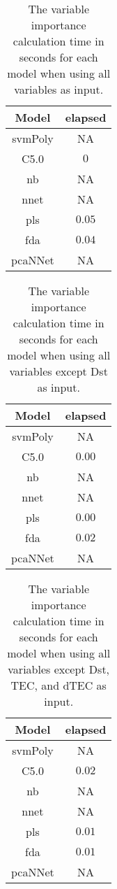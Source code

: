 \begin{table}[!ht]
	\centering
	\begin{tabular}{|c|c|}
		\hline
		Model & elapsed \\ \hline
		svmPoly & NA \\ \hline
		C5.0 & $0$ \\ \hline
		nb & NA \\ \hline
		nnet & NA \\ \hline
		pls & $0.05$ \\ \hline
		fda & $0.04$ \\ \hline
		pcaNNet & NA \\ \hline
	\end{tabular}
	\caption{The variable importance calculation time in seconds for each model when using all variables as input.}
	\label{tab:time:all:importance}
\end{table}

\begin{table}[!ht]
	\centering
	\begin{tabular}{|c|c|}
		\hline
		Model & elapsed \\ \hline
		svmPoly & NA \\ \hline
		C5.0 & $0.00$ \\ \hline
		nb & NA \\ \hline
		nnet & NA \\ \hline
		pls & $0.00$ \\ \hline
		fda & $0.02$ \\ \hline
		pcaNNet & NA \\ \hline
	\end{tabular}
	\caption{The variable importance calculation time in seconds for each model when using all variables except Dst as input.}
	\label{tab:time:noDst:importance}
\end{table}

\begin{table}[!ht]
	\centering
	\begin{tabular}{|c|c|}
		\hline
		Model & elapsed \\ \hline
		svmPoly & NA \\ \hline
		C5.0 & $0.02$ \\ \hline
		nb & NA \\ \hline
		nnet & NA \\ \hline
		pls & $0.01$ \\ \hline
		fda & $0.01$ \\ \hline
		pcaNNet & NA \\ \hline
	\end{tabular}
	\caption{The variable importance calculation time in seconds for each model when using all variables except Dst, TEC, and dTEC as input.}
	\label{tab:time:noTEC:importance}
\end{table}

